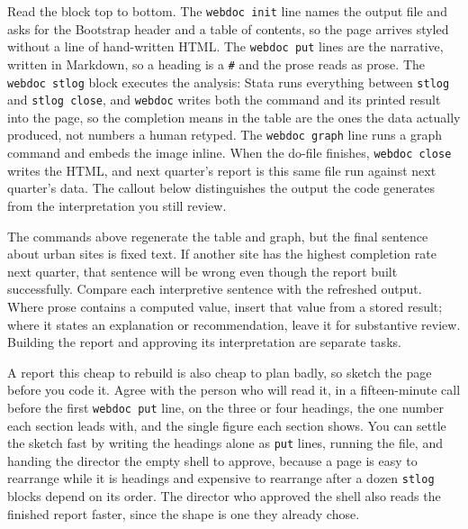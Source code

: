 \documentclass[
    a4paper,
    fontsize=10pt,
    twoside=true,
    numbers=noenddot,
]{kaobook}
\newenvironment{vizcallout}[1][Visualization to build]{%
    \begin{vizbox}[frametitle={#1}]%
}{%
    \end{vizbox}%
}
\begin{document}
Read the block top to bottom. The \texttt{webdoc init} line names the output file and asks for the Bootstrap header and a table of contents, so the page arrives styled without a line of hand-written HTML. The \texttt{webdoc put} lines are the narrative, written in Markdown, so a heading is a \texttt{\#} and the prose reads as prose. The \texttt{webdoc stlog} block executes the analysis: Stata runs everything between \texttt{stlog} and \texttt{stlog close}, and \texttt{webdoc} writes both the command and its printed result into the page, so the completion means in the table are the ones the data actually produced, not numbers a human retyped. The \texttt{webdoc graph} line runs a graph command and embeds the image inline. When the do-file finishes, \texttt{webdoc close} writes the HTML, and next quarter's report is this same file run against next quarter's data. The callout below distinguishes the output the code generates from the interpretation you still review.

\begin{vizcallout}[Check the narrative when the results change]
The commands above regenerate the table and graph, but the final sentence about urban sites is fixed text. If another site has the highest completion rate next quarter, that sentence will be wrong even though the report built successfully. Compare each interpretive sentence with the refreshed output. Where prose contains a computed value, insert that value from a stored result; where it states an explanation or recommendation, leave it for substantive review. Building the report and approving its interpretation are separate tasks.
\end{vizcallout}

A report this cheap to rebuild is also cheap to plan badly, so sketch the page before you code it. Agree with the person who will read it, in a fifteen-minute call before the first \texttt{webdoc put} line, on the three or four headings, the one number each section leads with, and the single figure each section shows. You can settle the sketch fast by writing the headings alone as \texttt{put} lines, running the file, and handing the director the empty shell to approve, because a page is easy to rearrange while it is headings and expensive to rearrange after a dozen \texttt{stlog} blocks depend on its order. The director who approved the shell also reads the finished report faster, since the shape is one they already chose.
\end{document}
